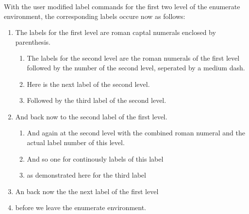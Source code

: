 \documentclass{article}
\begin{document}
With the user modified label commands for the first two level of the
enumerate environment, the corresponding labels occure now as follows:
\begin{enumerate}
\item The labels for the first level are roman captal numerals enclosed by
parenthesis.
\begin{enumerate}
\item The labels for the second level are the roman numerals of the first
      level followed by the number of the second level, seperated by
      a medium dash.
\item Here is the next label of the second level.
\item Followed by the third label of the second level.
\end{enumerate}
\item And back now to the second label of the first level.
\begin{enumerate}
\item And again at the second level with the combined roman numeral and
      the actual label number of this level.
\item And so one for continously labels of this label
\item as demonstrated here for the third label
\end{enumerate}
\item An back now the the next label of the first level
\item before we leave the enumerate environment.
\end{enumerate}
\end{document}
